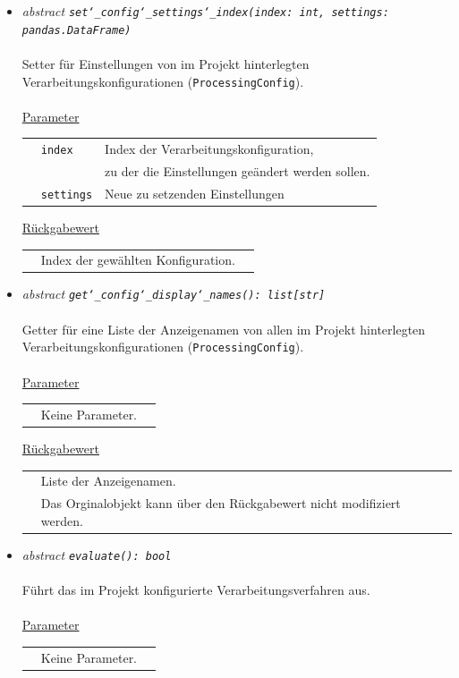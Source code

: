 \documentclass{article}
\begin{document}
\begin{itemize}
\item \textit{\flqq{}abstract\frqq} \texttt{\textit{set\char`_config\char`_settings\char`_index(index: int, settings: pandas.DataFrame)}}\\\\
Setter für Einstellungen von im Projekt hinterlegten Verarbeitungskonfigurationen (\texttt{ProcessingConfig}).
\\\\
\underline{Parameter}\\
\begin{tabular}{lll}
 & \texttt{index} & Index der Verarbeitungskonfiguration,\\
 && zu der die Einstellungen geändert werden sollen.\\
 & \texttt{settings} & Neue zu setzenden Einstellungen\\
\end{tabular}

\underline{Rückgabewert}\\
\begin{tabular}{lll}
 & Index der gewählten Konfiguration.\\
\end{tabular}


\item \textit{\flqq{}abstract\frqq} \texttt{\textit{get\char`_config\char`_display\char`_names(): list[str]}}\\\\
Getter für eine Liste der Anzeigenamen von allen im Projekt hinterlegten Verarbeitungskonfigurationen (\texttt{ProcessingConfig}).
\\\\
\underline{Parameter}\\
\begin{tabular}{lll}
 & Keine Parameter.
\end{tabular}

\underline{Rückgabewert}\\
\begin{tabular}{lll}
 & Liste der Anzeigenamen.\\
 & Das Orginalobjekt kann über den Rückgabewert nicht modifiziert werden.\\
\end{tabular}


\item \textit{\flqq{}abstract\frqq} \texttt{\textit{evaluate(): bool}}\\\\
Führt das im Projekt konfigurierte Verarbeitungsverfahren aus.
\\\\
\underline{Parameter}\\
\begin{tabular}{lll}
 & Keine Parameter.\\
\end{tabular}


\end{itemize}
\end{document}
